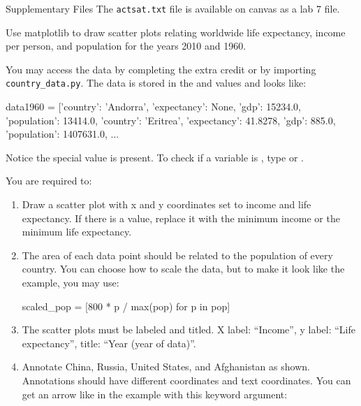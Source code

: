 \documentclass[11pt]{cselabheader}
\begin{document}
\begin{infobox}{Supplementary Files}
The \texttt{actsat.txt} file is available on canvas as a lab 7 file.
\end{infobox}

\begin{ex}[plotcountries.py]
Use matplotlib to draw scatter plots relating worldwide life expectancy,
income per person, and population for the years 2010 and 1960.

You may access the data by completing the extra credit or by importing
\texttt{country\_data.py}. The data is stored in the 
and  values and looks like:

\begin{python3code}
data1960 = [{'country': 'Andorra',
    'expectancy': None,
    'gdp': 15234.0,
    'population': 13414.0},
   {'country': 'Eritrea',
    'expectancy': 41.8278,
    'gdp': 885.0,
    'population': 1407631.0}, ...
\end{python3code}

Notice the special value  is present.
To check if a variable  is ,
type  or .


You are required to:

\begin{enumerate}
\item Draw a scatter plot with x and y coordinates set to income and life
expectancy. If there is a  value, replace it with the
minimum income or the minimum life expectancy.

\item The area of each data point should be related to the population of every
country. You can choose how to scale the data, but to make it look like the
example, you may use:

\begin{python3code}
scaled_pop = [800 * p / max(pop) for p in pop]
\end{python3code}

\item The scatter plots must be labeled and titled. X label: ``Income'', y
label: ``Life expectancy'', title: ``Year (year of data)''.

\item Annotate China, Russia, United States, and Afghanistan as shown.
Annotations should have different coordinates and text coordinates.
You can get an arrow like in the example with this keyword argument:


\end{enumerate}
\end{ex}
\end{document}
